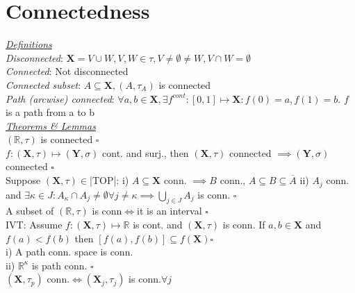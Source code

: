 \section{Connectedness}
\underline{\emph{Definitions}}\\
\emph{Disconnected}: $\mathbf{X}=V\cup W, V,W\in\tau,V\neq\emptyset\neq W,V\cap W=\emptyset$\\
\emph{Connected}: Not disconnected\\
\emph{Connected subset}: $A\subseteq\mathbf{X},(A,\tau_A)$ is connected\\
\emph{Path (arcwise) connected}:
$\forall a,b\in\mathbf{X},\exists f^{cont}:[0,1]\mapsto\mathbf{X}:f(0)=a,f(1)=b$. $f$ is a path from a to b
\\\underline{\emph{Theorems \& Lemmas}}\\
$(\mathbb{R},\tau)$ is connected $\square$\\
$f:(\mathbf{X},\tau)\mapsto(\mathbf{Y},\sigma)$ cont. and surj., then $(\mathbf{X},\tau)$ connected $\implies(\mathbf{Y},\sigma)$ connected $\square$\\
Suppose $(\mathbf{X},\tau)\in$|TOP|:
i) $A\subseteq\mathbf{X}$ conn. $\implies B$ conn., $A\subseteq B\subseteq\overline{A}$
ii) $A_j$ conn. and $\exists\kappa\in J:A_\kappa\cap A_j\neq\emptyset\forall j\neq\kappa\implies\bigcup\limits_{j\in J}A_j$ is conn. $\square$\\
A subset of $(\mathbb{R},\tau)$ is conn$\iff$it is an interval $\square$\\
IVT: Assume $f:(\mathbf{X},\tau)\mapsto\mathbb{R}$ is cont. and $(\mathbf{X},\tau)$ is conn. If $a,b\in\mathbf{X}$ and $f(a)<f(b)$ then $[f(a),f(b)]\subseteq f(\mathbf{X}) \square$\\
i) A path conn. space is conn.\\
ii) $\mathbb{R}^\kappa$ is path conn. 
$\square$\\
$(\mathbf{X},\tau_p)$ conn.$\iff(\mathbf{X}_j,\tau_j)$ is conn.$\forall j$

